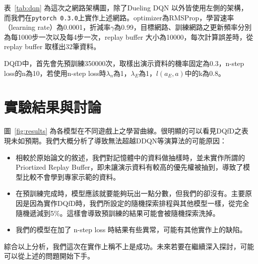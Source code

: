 \documentclass{article}
\begin{document}
表~\ref{tab:dqn} 為這次之網路架構圖，除了Dueling DQN 以外皆使用左側的架構，而我們在\texttt{pytorch 0.3.0}上實作上述網路。optimizer為RMSProp，學習速率（learning rate）為0.0001，折減率$\gamma$為0.99，目標網路、訓練網路之更新頻率分別為每1000步一次以及每4步一次，replay buffer 大小為10000，每次計算誤差時，從replay buffer 取樣出32筆資料。\par
DQfD中，首先會先預訓練350000次，取樣出演示資料的機率固定為0.3，n-step loss的n為10，若使用n-step loss時$\lambda_n$為1，$\lambda_E$為1，$l(a_E,a)$中的k為0.8。

\section{實驗結果與討論}

圖~\ref{fig:results} 為各模型在不同遊戲上之學習曲線。很明顯的可以看見DQfD之表現未如預期。我們大概分析了導致無法超越DDQN等演算法的可能原因：
\begin{itemize}
    \item 相較於原始論文的敘述，我們對記憶體中的資料做抽樣時，並未實作所謂的Priortized Replay Buffer，即未讓演示資料有較高的優先權被抽到，導致了模型比較不會學到專家示範的資料。
    \item 在預訓練完成時，模型應該就要能夠玩出一點分數，但我們的卻沒有。主要原因是因為實作DQfD時，我們所設定的隨機探索排程與其他模型一樣，從完全隨機遞減到5\%。這樣會導致預訓練的結果可能會被隨機探索洗掉。
    \item 我們的模型在加了 n-step loss 時結果有些異常，可能有其他實作上的缺陷。
\end{itemize}
綜合以上分析，我們這次在實作上稱不上是成功。未來若要在繼續深入探討，可能可以從上述的問題開始下手。
\end{document}
